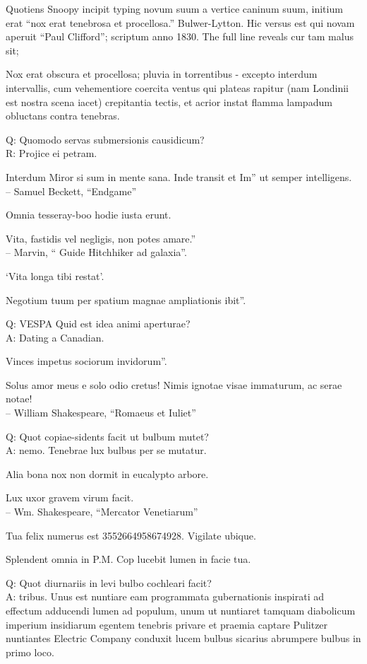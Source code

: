 \documentclass[titlepage,12pt]{memoir}
\begin{document}
Quotiens Snoopy incipit typing novum suum a vertice caninum suum,
initium erat “nox erat tenebrosa et procellosa.”
Bulwer-Lytton. Hic versus est qui novam aperuit “Paul Clifford”;
scriptum anno 1830. The full line reveals cur tam malus sit;

Nox erat obscura et procellosa; pluvia in torrentibus - excepto
interdum intervallis, cum vehementiore coercita
ventus qui plateas rapitur (nam Londinii est nostra scena
iacet) crepitantia tectis, et acrior instat
flamma lampadum obluctans contra tenebras.

Q: Quomodo servas submersionis causidicum?\\
R: Projice ei petram.

Interdum Miror si sum in mente sana. Inde transit et Im”
ut semper intelligens.
\\-- Samuel Beckett, “Endgame”

Omnia tesseray-boo hodie iusta erunt.

Vita, fastidis vel negligis, non potes amare.”
\\-- Marvin, “ Guide Hitchhiker ad galaxia”.

‘Vita longa tibi restat’.

Negotium tuum per spatium magnae ampliationis ibit”.

Q: VESPA Quid est idea animi aperturae?\\
A: Dating a Canadian.

Vinces impetus sociorum invidorum”.

Solus amor meus e solo odio cretus!
Nimis ignotae visae immaturum, ac serae notae!
\\-- William Shakespeare, “Romaeus et Iuliet”

Q: Quot copiae-sidents facit ut bulbum mutet?\\
A: nemo. Tenebrae lux bulbus per se mutatur.

Alia bona nox non dormit in eucalypto arbore.

Lux uxor gravem virum facit.
\\-- Wm. Shakespeare, “Mercator Venetiarum”

Tua felix numerus est 3552664958674928. Vigilate ubique.

Splendent omnia in P.M. Cop lucebit lumen in facie tua.

Q: Quot diurnariis in levi bulbo cochleari facit?\\
A: tribus. Unus est nuntiare eam programmata gubernationis inspirati ad effectum adducendi
lumen ad populum, unum ut nuntiaret tamquam diabolicum imperium insidiarum
egentem tenebris privare et praemia captare Pulitzer
nuntiantes Electric Company conduxit lucem bulbus sicarius abrumpere
bulbus in primo loco.
\end{document}

